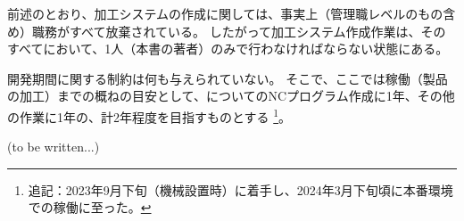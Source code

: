 




前述のとおり、加工システムの作成に関しては、事実上（管理職レベルのもの含め）職務がすべて放棄されている。
したがって加工システム作成作業は、そのすべてにおいて、1人（本書の著者）のみで行わなければならない状態にある。



開発期間に関する制約は何も与えられていない。
そこで、ここでは稼働（製品の加工）までの概ねの目安として、\Dimple についてのNCプログラム作成に1年、その他の作業に1年の、計2年程度を目指すものとする
\footnote{追記：2023年9月下旬（機械設置時）に着手し、2024年3月下旬頃に本番環境での稼働に至った。}。



(to be written...)

